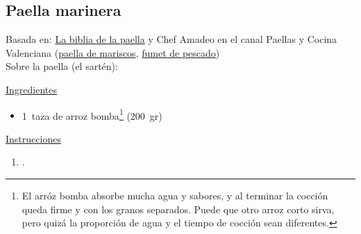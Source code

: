 \subsection{Paella marinera}

Basada en: \href{https://www.la-biblia-de-la-paella.es/recette/paella-de-marisco/}{La biblia de la paella} y Chef Amadeo en el canal Paellas y Cocina Valenciana (\href{https://www.youtube.com/watch?v=WbaWsTqg9CY}{paella de mariscos}, \href{https://www.youtube.com/watch?v=rem5NKXjEBo}{fumet de pescado}) \\

Sobre la paella (el sartén): 

\underline{Ingredientes}

\begin{itemize}
\item \SI{1}{taza} de arroz bomba\footnote{El arróz bomba absorbe mucha agua y sabores, y al terminar la cocción queda firme y con los granos separados. Puede que otro arroz corto sirva, pero quizá la proporción de agua y el tiempo de cocción sean diferentes.} (\SI{200}{gr})
\end{itemize}


\underline{Instrucciones}

\begin{enumerate}
\item .
\end{enumerate}

